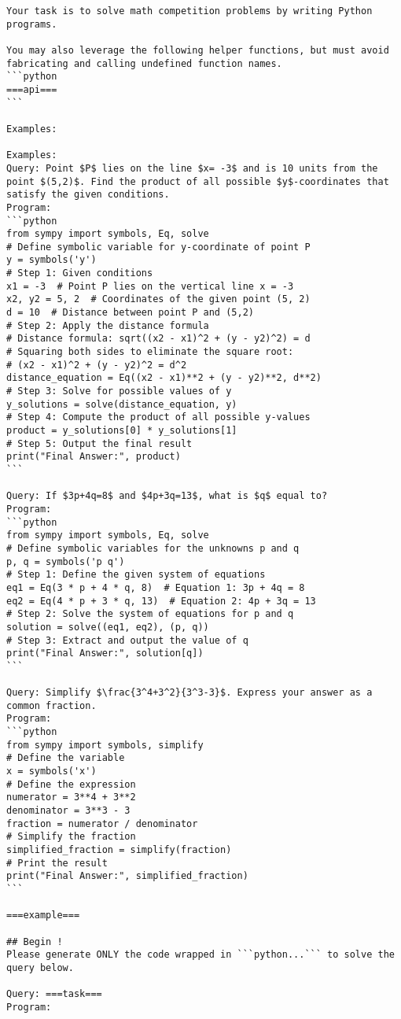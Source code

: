 \begin{tcolorbox}[title=Prompt on MATH, breakable, width=\textwidth,top=0mm]
\begin{Verbatim}[breaklines, fontsize=\footnotesize]
Your task is to solve math competition problems by writing Python programs.

You may also leverage the following helper functions, but must avoid fabricating and calling undefined function names.
```python
===api===
```

Examples: 

Examples: 
Query: Point $P$ lies on the line $x= -3$ and is 10 units from the point $(5,2)$. Find the product of all possible $y$-coordinates that satisfy the given conditions.
Program: 
```python
from sympy import symbols, Eq, solve
# Define symbolic variable for y-coordinate of point P
y = symbols('y')
# Step 1: Given conditions
x1 = -3  # Point P lies on the vertical line x = -3
x2, y2 = 5, 2  # Coordinates of the given point (5, 2)
d = 10  # Distance between point P and (5,2)
# Step 2: Apply the distance formula
# Distance formula: sqrt((x2 - x1)^2 + (y - y2)^2) = d
# Squaring both sides to eliminate the square root:
# (x2 - x1)^2 + (y - y2)^2 = d^2
distance_equation = Eq((x2 - x1)**2 + (y - y2)**2, d**2)
# Step 3: Solve for possible values of y
y_solutions = solve(distance_equation, y)
# Step 4: Compute the product of all possible y-values
product = y_solutions[0] * y_solutions[1]
# Step 5: Output the final result
print("Final Answer:", product)
```

Query: If $3p+4q=8$ and $4p+3q=13$, what is $q$ equal to?
Program:
```python
from sympy import symbols, Eq, solve
# Define symbolic variables for the unknowns p and q
p, q = symbols('p q')
# Step 1: Define the given system of equations
eq1 = Eq(3 * p + 4 * q, 8)  # Equation 1: 3p + 4q = 8
eq2 = Eq(4 * p + 3 * q, 13)  # Equation 2: 4p + 3q = 13
# Step 2: Solve the system of equations for p and q
solution = solve((eq1, eq2), (p, q))
# Step 3: Extract and output the value of q
print("Final Answer:", solution[q])
```

Query: Simplify $\frac{3^4+3^2}{3^3-3}$. Express your answer as a common fraction.
Program:
```python
from sympy import symbols, simplify
# Define the variable
x = symbols('x')
# Define the expression
numerator = 3**4 + 3**2
denominator = 3**3 - 3
fraction = numerator / denominator
# Simplify the fraction
simplified_fraction = simplify(fraction)
# Print the result
print("Final Answer:", simplified_fraction)
```

===example===

## Begin !
Please generate ONLY the code wrapped in ```python...``` to solve the query below.

Query: ===task===
Program:
\end{Verbatim}
\end{tcolorbox}



